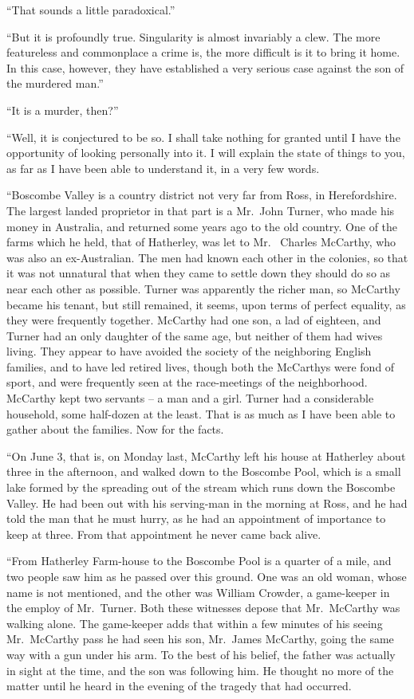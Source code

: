 “That sounds a little paradoxical.”

“But it is profoundly true. Singularity is almost invariably
a clew. The more featureless and commonplace a crime is,
the more difficult is it to bring it home. In this case, however,
they have established a very serious case against the son
of the murdered man.”

“It is a murder, then?”

“Well, it is conjectured to be so. I shall take nothing for
granted until I have the opportunity of looking personally
into it. I will explain the state of things to you, as far as I
have been able to understand it, in a very few words.

“Boscombe Valley is a country district not very far from
Ross, in Herefordshire. The largest landed proprietor in
that part is a Mr.~John Turner, who made his money in Australia,
and returned some years ago to the old country. One
of the farms which he held, that of Hatherley, was let to Mr.\ %
Charles McCarthy, who was also an ex-Australian. The men
had known each other in the colonies, so that it was not
unnatural that when they came to settle down they should do so
as near each other as possible. Turner was apparently the
richer man, so McCarthy became his tenant, but still remained,
it seems, upon terms of perfect equality, as they were
frequently together. McCarthy had one son, a lad of eighteen,
and Turner had an only daughter of the same age, but
neither of them had wives living. They appear to have avoided
the society of the neighboring English families, and to have
led retired lives, though both the McCarthys were fond of
sport, and were frequently seen at the race-meetings of the
neighborhood. McCarthy kept two servants -- a man and a
girl. Turner had a considerable household, some half-dozen
at the least. That is as much as I have been able to gather
about the families. Now for the facts.

“On June 3, that is, on Monday last, McCarthy left his
house at Hatherley about three in the afternoon, and walked
down to the Boscombe Pool, which is a small lake formed by
the spreading out of the stream which runs down the Boscombe
Valley. He had been out with his serving-man in the
morning at Ross, and he had told the man that he must hurry,
as he had an appointment of importance to keep at three.
From that appointment he never came back alive.

“From Hatherley Farm-house to the Boscombe Pool is a
quarter of a mile, and two people saw him as he passed over
this ground. One was an old woman, whose name is not
mentioned, and the other was William Crowder, a game-keeper
in the employ of Mr.~Turner. Both these witnesses depose
that Mr.~McCarthy was walking alone. The game-keeper adds
that within a few minutes of his seeing Mr.~McCarthy pass he
had seen his son, Mr.~James McCarthy, going the same way
with a gun under his arm. To the best of his belief, the father
was actually in sight at the time, and the son was following
him. He thought no more of the matter until he heard
in the evening of the tragedy that had occurred.

